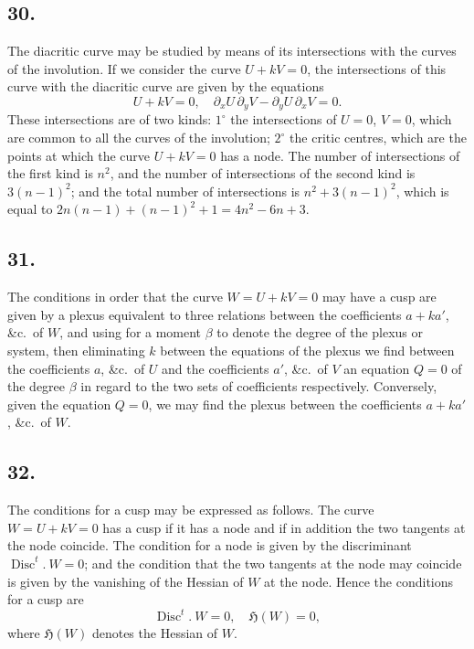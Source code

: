 \documentclass[11pt,a4paper]{article}
\theoremstyle{definition}
\newcommand{\hes}{\mathfrak{H}}
\DeclareMathOperator{\Disc}{Disc}
\begin{document}
\subsection*{30.}

The diacritic curve may be studied by means of its intersections with the curves of
the involution. If we consider the curve $U + kV = 0$, the intersections of this curve with
the diacritic curve are given by the equations
\[
U + kV = 0,\quad \partial_{x}U\,\partial_{y}V - \partial_{y}U\,\partial_{x}V = 0.
\]
These intersections are of two kinds: $1^{\circ}$ the intersections of $U = 0$, $V = 0$, which are
common to all the curves of the involution; $2^{\circ}$ the critic centres, which are the points
at which the curve $U + kV = 0$ has a node. The number of intersections of the first kind
is $n^{2}$, and the number of intersections of the second kind is $3(n - 1)^{2}$; and the total number
of intersections is $n^{2} + 3(n - 1)^{2}$, which is equal to $2n(n - 1) + (n - 1)^{2} + 1 = 4n^{2} - 6n + 3$.

\subsection*{31.}

The conditions in order that the curve $W = U + kV = 0$ may have a cusp are
given by a plexus equivalent to three relations between the coefficients $a + ka'$, \&c.\ of
$W$, and using for a moment $\beta$ to denote the degree of the plexus or system, then
eliminating $k$ between the equations of the plexus we find between the coefficients
$a$, \&c.\ of $U$ and the coefficients $a'$, \&c.\ of $V$ an equation $Q = 0$ of the degree $\beta$ in
regard to the two sets of coefficients respectively. Conversely, given the equation
$Q = 0$, we may find the plexus between the coefficients $a + ka'$, \&c.\ of $W$.

\newpage
\subsection*{32.}

The conditions for a cusp may be expressed as follows. The curve $W = U + kV = 0$
has a cusp if it has a node and if in addition the two tangents at the node coincide.
The condition for a node is given by the discriminant $\Disc^{t}.\ W = 0$; and the condition
that the two tangents at the node may coincide is given by the vanishing of the Hessian
of $W$ at the node. Hence the conditions for a cusp are
\[
\Disc^{t}.\ W = 0,\quad \hes(W) = 0,
\]
where $\hes(W)$ denotes the Hessian of $W$.
\end{document}
